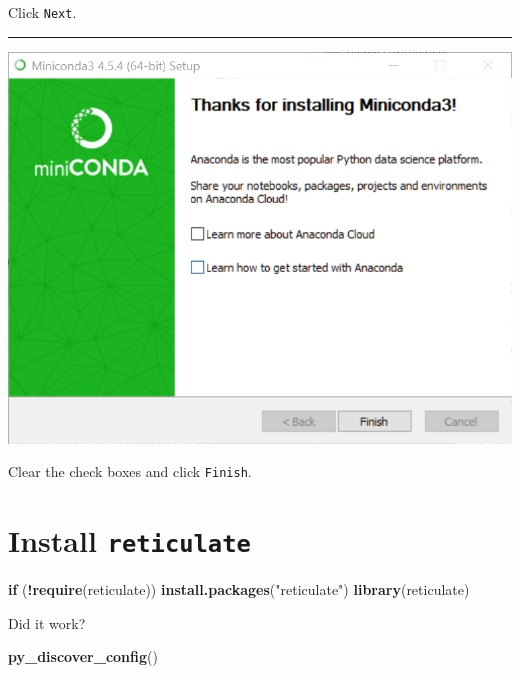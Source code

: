 \documentclass[]{book}
\newenvironment{Shaded}{\begin{snugshade}}{\end{snugshade}}
\newcommand{\ControlFlowTok}[1]{\textcolor[rgb]{0.13,0.29,0.53}{\textbf{#1}}}
\newcommand{\KeywordTok}[1]{\textcolor[rgb]{0.13,0.29,0.53}{\textbf{#1}}}
\newcommand{\NormalTok}[1]{#1}
\newcommand{\OperatorTok}[1]{\textcolor[rgb]{0.81,0.36,0.00}{\textbf{#1}}}
\newcommand{\StringTok}[1]{\textcolor[rgb]{0.31,0.60,0.02}{#1}}
\theoremstyle{definition}
\theoremstyle{definition}
\theoremstyle{definition}
\theoremstyle{remark}
\begin{document}
Click \texttt{Next}.

\begin{center}\rule{0.5\linewidth}{\linethickness}\end{center}

\begin{center}\includegraphics[width=0.9\linewidth]{screenshots/2018-08-31_16_21_44-Miniconda3_4.5.4_(64-bit)_Setup} \end{center}

Clear the check boxes and click \texttt{Finish}.

\hypertarget{install-reticulate}{%
\section{\texorpdfstring{Install
\texttt{reticulate}}{Install reticulate}}\label{install-reticulate}}

\begin{Shaded}
\begin{Highlighting}[]
\ControlFlowTok{if}\NormalTok{ (}\OperatorTok{!}\KeywordTok{require}\NormalTok{(reticulate)) }\KeywordTok{install.packages}\NormalTok{(}\StringTok{"reticulate"}\NormalTok{)}
\KeywordTok{library}\NormalTok{(reticulate)}
\end{Highlighting}
\end{Shaded}

Did it work?

\begin{Shaded}
\begin{Highlighting}[]
\KeywordTok{py_discover_config}\NormalTok{()}
\end{Highlighting}
\end{Shaded}
\end{document}
